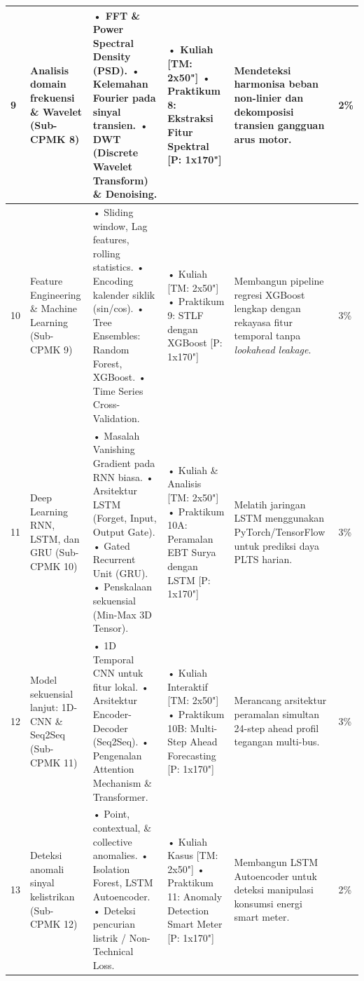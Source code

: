 \documentclass[9.5pt,a4paper]{article}
\begin{document}
\begin{longtable}{|C{0.6cm}|L{3.2cm}|L{4.5cm}|L{3.8cm}|L{3.8cm}|C{0.8cm}|}
9 & Analisis domain frekuensi \& Wavelet (Sub-CPMK 8) & 
• FFT \& Power Spectral Density (PSD).\newline
• Kelemahan Fourier pada sinyal transien.\newline
• DWT (Discrete Wavelet Transform) \& Denoising. & 
• Kuliah [TM: 2x50"]\newline
• Praktikum 8: Ekstraksi Fitur Spektral [P: 1x170"] & 
Mendeteksi harmonisa beban non-linier dan dekomposisi transien gangguan arus motor. & 2\% \\ \hline

10 & Feature Engineering \& Machine Learning (Sub-CPMK 9) & 
• Sliding window, Lag features, rolling statistics.\newline
• Encoding kalender siklik (sin/cos).\newline
• Tree Ensembles: Random Forest, XGBoost.\newline
• Time Series Cross-Validation. & 
• Kuliah [TM: 2x50"]\newline
• Praktikum 9: STLF dengan XGBoost [P: 1x170"] & 
Membangun pipeline regresi XGBoost lengkap dengan rekayasa fitur temporal tanpa \textit{lookahead leakage}. & 3\% \\ \hline

11 & Deep Learning RNN, LSTM, dan GRU (Sub-CPMK 10) & 
• Masalah Vanishing Gradient pada RNN biasa.\newline
• Arsitektur LSTM (Forget, Input, Output Gate).\newline
• Gated Recurrent Unit (GRU).\newline
• Penskalaan sekuensial (Min-Max 3D Tensor). & 
• Kuliah \& Analisis [TM: 2x50"]\newline
• Praktikum 10A: Peramalan EBT Surya dengan LSTM [P: 1x170"] & 
Melatih jaringan LSTM menggunakan PyTorch/TensorFlow untuk prediksi daya PLTS harian. & 3\% \\ \hline

12 & Model sekuensial lanjut: 1D-CNN \& Seq2Seq (Sub-CPMK 11) & 
• 1D Temporal CNN untuk fitur lokal.\newline
• Arsitektur Encoder-Decoder (Seq2Seq).\newline
• Pengenalan Attention Mechanism \& Transformer. & 
• Kuliah Interaktif [TM: 2x50"]\newline
• Praktikum 10B: Multi-Step Ahead Forecasting [P: 1x170"] & 
Merancang arsitektur peramalan simultan 24-step ahead profil tegangan multi-bus. & 3\% \\ \hline

13 & Deteksi anomali sinyal kelistrikan (Sub-CPMK 12) & 
• Point, contextual, \& collective anomalies.\newline
• Isolation Forest, LSTM Autoencoder.\newline
• Deteksi pencurian listrik / Non-Technical Loss. & 
• Kuliah Kasus [TM: 2x50"]\newline
• Praktikum 11: Anomaly Detection Smart Meter [P: 1x170"] & 
Membangun LSTM Autoencoder untuk deteksi manipulasi konsumsi energi smart meter. & 2\% \\ \hline


\end{longtable}
\end{document}
